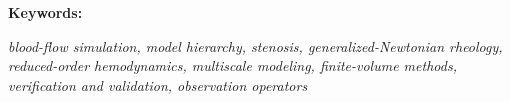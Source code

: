 \begin{samepage}
\noindent\textbf{Keywords:} {\itshape blood-flow simulation, model hierarchy,
stenosis, generalized-Newtonian rheology, reduced-order hemodynamics,
multiscale modeling, finite-volume methods, verification and validation,
observation operators\par}
\end{samepage}

